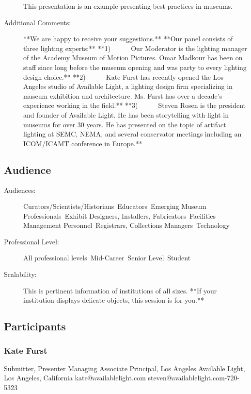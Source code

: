 \documentclass{report}
\begin{document}
\begin{description}
This presentation is an example presenting best practices in museums.
							    
                    \item [Additional Comments: ]**We are happy to receive your suggestions.**
**Our panel consists of three lighting experts:**
**1)      Our Moderator is the lighting manager of the Academy Museum of Motion Pictures. Omar Madkour has been on staff since long before the museum opening and was party to every lighting design choice.**
**2)      Kate Furst has recently opened the Los Angeles studio of Available Light, a lighting design firm specializing in museum exhibition and architecture. Ms. Furst has over a decade’s experience working in the field.**
**3)      Steven Rosen is the president and founder of Available Light. He has been storytelling with light in museums for over 30 years. He has presented on the topic of artifact lighting at SEMC, NEMA, and several conservator meetings including an ICOM/ICAMT conference in Europe.**

                \end{description}
              \subsection*{Audience}
                \begin{description}
                  \item [Audiences:]Curators/Scientists/Historians~Educators~Emerging Museum Professionals~Exhibit Designers, Installers, Fabricators~Facilities Management Personnel~Registrars, Collections Managers~Technology~
                  \item[Professional Level:]All professional levels~Mid-Career~Senior Level~Student~
                \item[Scalability:] This is pertinent information of institutions of all sizes.   **If your institution displays delicate objects, this session is for you.**

							
              \end{description}
            \subsection*{Participants}
              \subsubsection*{ Kate Furst }
              Submitter, Presenter\newline
              Managing Associate Principal, Los Angeles\newline
              Available Light, Los Angeles, California
              \newline
              kate@availablelight.com\newline
              steven@availablelight.com-720-5323\newline
\end{document}
